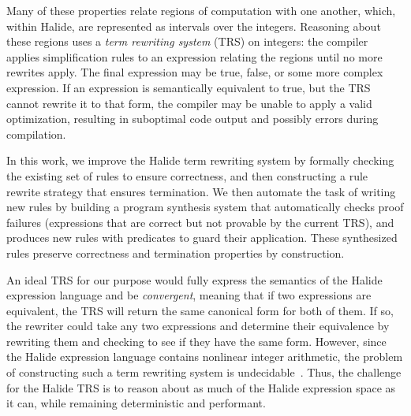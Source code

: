 \documentclass[sigplan,10pt,review,anonymous]{acmart}\settopmatter{printfolios=true,printccs=false,printacmref=false}
\begin{document}
Many of these properties relate regions of computation with one another,
which, within Halide, are represented as intervals over the integers.
Reasoning about these regions uses a \textit{term rewriting system}
(TRS) on integers: the compiler applies simplification rules to an expression relating
the regions until no more rewrites apply.  The final expression may be
true, false, or some more complex expression. If an expression is semantically equivalent to true,
but the TRS cannot rewrite it to that form, the compiler may be unable to apply a valid optimization,
resulting in suboptimal code output and possibly errors during compilation.

In this work, we improve the Halide term rewriting system by formally checking the existing
set of rules to ensure correctness, and then constructing a rule rewrite strategy that 
ensures termination.  We then automate the task of writing new rules by building a program
synthesis system that automatically checks proof failures (expressions that are
correct but not provable by the current TRS), and produces new rules with predicates to guard their application.
These synthesized rules preserve correctness and termination properties by construction.

An ideal TRS for our purpose would fully express the semantics of the Halide
expression language and be \emph{convergent}, meaning that if two expressions
are equivalent, the TRS will return the same canonical form for both of them. If
so, the rewriter could take any two expressions and determine their equivalence
 by rewriting them and checking to see if they have the same form.
However, since the Halide expression language contains nonlinear integer
arithmetic, the problem of constructing such a term rewriting system is
undecidable~\cite{matiyasevich1993hilberts10th}. Thus, the challenge for the
Halide TRS is to reason about as much of the Halide expression space
as it can, while remaining deterministic and performant.

\end{document}

